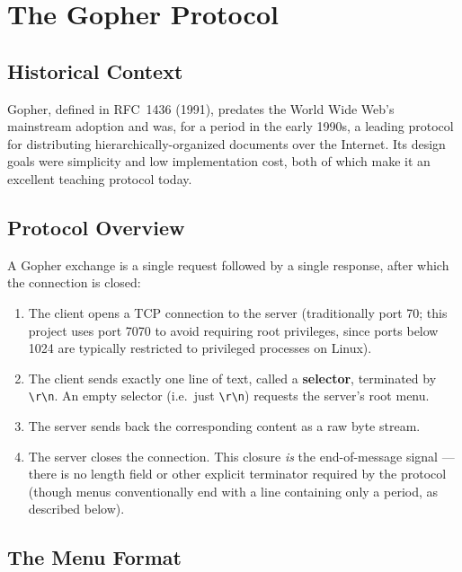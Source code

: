 \chapter{The Gopher Protocol}
\label{chap:gopher-protocol}

\section{Historical Context}

Gopher, defined in RFC~1436 (1991), predates the World Wide Web's mainstream adoption and was, for a period in the early 1990s, a leading protocol for distributing hierarchically-organized documents over the Internet. Its design goals were simplicity and low implementation cost, both of which make it an excellent teaching protocol today.

\section{Protocol Overview}

A Gopher exchange is a single request followed by a single response, after which the connection is closed:

\begin{enumerate}
    \item The client opens a TCP connection to the server (traditionally port 70; this project uses port 7070 to avoid requiring root privileges, since ports below 1024 are typically restricted to privileged processes on Linux).
    \item The client sends exactly one line of text, called a \textbf{selector}, terminated by \texttt{\textbackslash r\textbackslash n}. An empty selector (i.e.\ just \texttt{\textbackslash r\textbackslash n}) requests the server's root menu.
    \item The server sends back the corresponding content as a raw byte stream.
    \item The server closes the connection. This closure \emph{is} the end-of-message signal --- there is no length field or other explicit terminator required by the protocol (though menus conventionally end with a line containing only a period, as described below).
\end{enumerate}

\section{The Menu Format}

